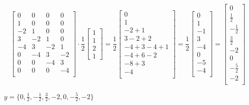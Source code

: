 \documentclass[a4paper, 11pt]{exam}
\begin{document}
\begin{center}
\[
\begin{bmatrix}
0&0&0&0\\
1&0&0&0\\
-2&1&0&0\\
3&-2&1&0\\
-4&3&-2&1\\
0&-4&3&-2\\
0&0&-4&3\\
0&0&0&-4\\

\end{bmatrix} 
\cdot
\frac{1}{2}\begin{bmatrix}
1\\
1\\
2\\
1
\end{bmatrix}
=
\frac{1}{2}
\begin{bmatrix}
0\\
1\\
-2 + 1\\
3 -2 + 2\\
-4 + 3 - 4 + 1\\
-4 + 6 - 2\\
-8 + 3\\
-4\\
\end{bmatrix}
=
\frac{1}{2}
\begin{bmatrix}
0\\
1\\
-1\\
3\\
-4\\
0\\
-5\\
-4\\
\end{bmatrix}
=
\begin{bmatrix}
0\\
\frac{1}{2}
\\
-\frac{1}{2}
\\
\frac{3}{2}\\
-2\\
0\\
-\frac{5}{2}\\
-2\\
\end{bmatrix}
\]
\end{center}
\begin{center}
$y = \lbrace0,\frac{1}{2},-\frac{1}{2},\frac{3}{2},-2,0,-\frac{5}{2},-2 \rbrace$
\end{center}
\end{document}
